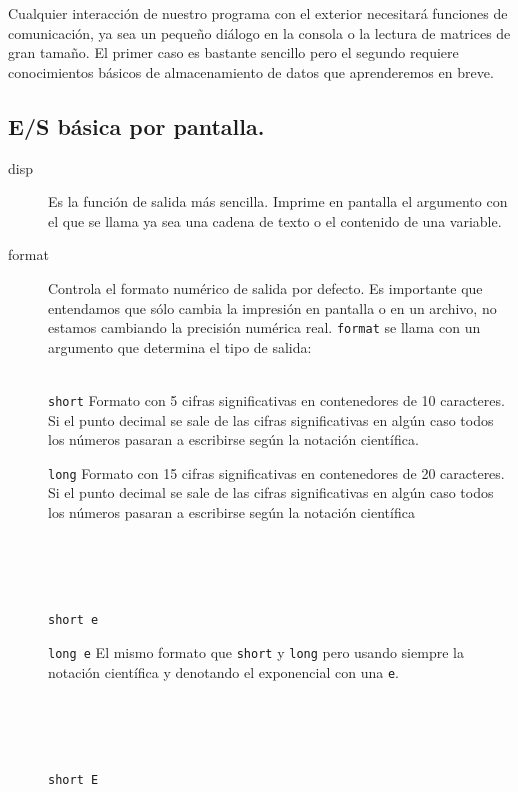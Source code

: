 Cualquier interacción de nuestro programa con el exterior necesitará
funciones de comunicación, ya sea un pequeño diálogo en la consola o
la lectura de matrices de gran tamaño. El primer caso es bastante
sencillo pero el segundo requiere conocimientos básicos de
almacenamiento de datos que aprenderemos en breve.


\subsection{E/S básica por pantalla.}

\begin{description}
\item [disp]Es la función de salida más sencilla. Imprime en pantalla
  el argumento con el que se llama ya sea una cadena de texto o el
  contenido de una variable.
\item [format]Controla el formato numérico de salida por defecto. Es
  importante que entendamos que sólo cambia la impresión en pantalla o
  en un archivo, no estamos cambiando la precisión numérica real.
  \texttt{format} se
  llama con un argumento que determina el tipo de salida:\\
  \\
  \begin{minipage}[c]{0.8\columnwidth}%
    \texttt{short} Formato con 5 cifras significativas en
    contenedores de 10 caracteres. Si el punto decimal se sale de las
    cifras significativas en algún caso todos los números pasaran a
    escribirse según la notación científica.

    \texttt{long} Formato con 15 cifras significativas en
    contenedores de 20 caracteres. Si el punto decimal se sale de las
    cifras significativas en algún caso todos los números pasaran a
    escribirse según la notación científica\end{minipage}%
  \\
  \\
  \\
  \begin{minipage}[c]{0.8\columnwidth}%
{\texttt{short e}} 

{\texttt{long e}} El mismo formato que \texttt{short} y \texttt{long}
pero usando siempre la notación científica y denotando el exponencial
con una \texttt{e}.\end{minipage}%
\\
\\
\\
\begin{minipage}[c]{0.8\columnwidth}%
{\texttt{short E}} 


\end{minipage}
\end{description}
